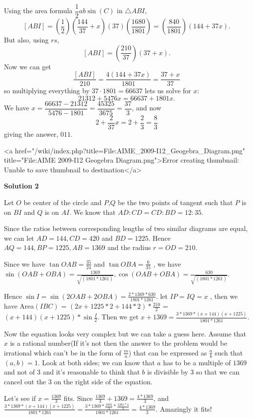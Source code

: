 \begin{enumerate}
 Using the area formula $\dfrac{1}{2}ab\sin(C)$ in $\triangle ABI$, 
 \[[ABI]=\left(\dfrac{1}{2}\right)\left(\dfrac{144}{37}+x\right)(37)\left(\dfrac{1680}{1801}\right)=\left(\dfrac{840}{1801}\right)(144+37x).\] But also, using $rs$, 
 \[[ABI]=\left(\dfrac{210}{37}\right)(37+x).\] Now we can get 
 \[\dfrac{[ABI]}{210}=\dfrac{4(144+37x)}{1801}=\dfrac{37+x}{37}\] so multiplying everything by $37\cdot 1801=66637$ lets us solve for $x$: 
 \[21312+5476x=66637+1801x.\] We have $x=\dfrac{66637-21312}{5476-1801}=\dfrac{45325}{3675}=\dfrac{37}{3}$, and now 
 \[2+\dfrac{2}{37}x=2+\dfrac{2}{3}=\dfrac{8}{3}\] giving the answer, $\boxed{011}$.

 <a href="/wiki/index.php?title=File:AIME\_2009-I12\_Geogebra\_Diagram.png" title="File:AIME 2009-I12 Geogebra Diagram.png">Error creating thumbnail: Unable to save thumbnail to destination</a>




\textbf{Solution 2}

Let $O$ be center of the circle and $P$,$Q$ be the two points of tangent such that $P$ is on $BI$ and $Q$ is on $AI$. We know that $AD:CD = CD:BD = 12:35$.

 Since the ratios between corresponding lengths of two similar diagrams are equal, we can let $AD = 144, CD = 420$ and $BD = 1225$. Hence $AQ = 144, BP = 1225, AB = 1369$ and the radius $r = OD = 210$. 

 Since we have $\tan OAB = \frac {35}{24}$ and $\tan OBA = \frac{6}{35}$ , we have $\sin {(OAB + OBA)} = \frac {1369}{\sqrt {(1801*1261)}},$$\cos {(OAB + OBA)} = \frac {630}{\sqrt {(1801*1261)}}$.

 Hence $\sin I = \sin {(2OAB + 2OBA)} = \frac {2*1369*630}{1801*1261}$. let $IP = IQ = x$ , then we have Area$(IBC)$ = $(2x + 1225*2 + 144*2)*\frac {210}{2}$ = $(x + 144)(x + 1225)* \sin {\frac {I}{2}}$. Then we get $x + 1369 = \frac {3*1369*(x + 144)(x + 1225)}{1801*1261}$.

 Now the equation looks very complex but we can take a guess here. Assume that $x$ is a rational number(If it's not then the answer to the problem would be irrational which can't be in the form of $\frac {m}{n}$) that can be expressed as $\frac {a}{b}$ such that $(a,b) = 1$. Look at both sides; we can know that $a$ has to be a multiple of $1369$ and not of $3$ and it's reasonable to think that $b$ is divisible by $3$ so that we can cancel out the $3$ on the right side of the equation.

 Let's see if $x = \frac {1369}{3}$ fits. Since $\frac {1369}{3} + 1369 = \frac {4*1369}{3}$, and $\frac {3*1369*(x + 144)(x + 1225)}{1801*1261} = \frac {3*1369* \frac {1801}{3} * \frac {1261*4}{3}} {1801*1261} = \frac {4*1369}{3}$. Amazingly it fits!


\end{enumerate}
